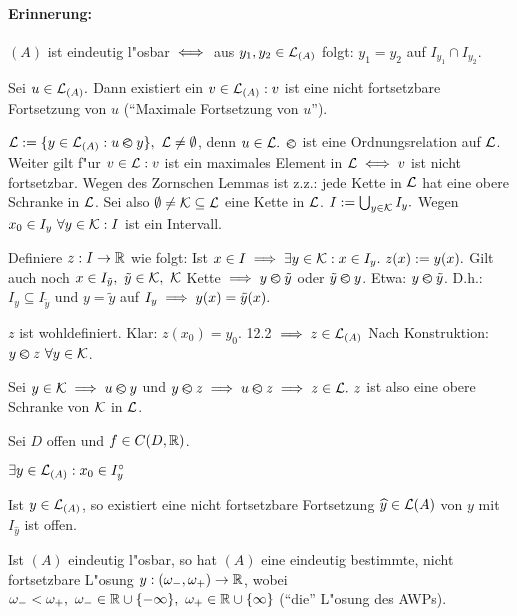 \documentclass[a4paper,twoside,DIV15,BCOR12mm]{scrbook}
\begin{document}
\paragraph{Erinnerung:}
$(A)$ ist eindeutig l"osbar $\iff$ aus $y_1,y_2 \in \mathcal{L}_{(A)}$ folgt: $y_1 = y_2$ auf $I_{y_1} \cap I_{y_2}$.

\begin{satz} %
Sei $u \in \mathcal{L}_{(A)}.$ Dann existiert ein $v \in \mathcal{L}_{(A)}: v$ ist eine nicht fortsetzbare Fortsetzung von $u$ ("`Maximale Fortsetzung von $u$"').
\end{satz}

\begin{beweis}
$\L:=\{y\in\L_{(A)}:u\ole y\},\ \L\ne\emptyset$, denn $u\in\mathcal{L}.$ $\varolessthan$ ist eine Ordnungsrelation auf $\mathcal{L}$. Weiter gilt f"ur $v\in\mathcal{L}: v$ ist ein maximales Element in $\mathcal{L} \iff v$ ist nicht fortsetzbar. Wegen des Zornschen Lemmas ist z.z.: jede Kette in $\mathcal{L}$ hat eine obere Schranke in $\mathcal{L}$. Sei also $\emptyset \ne \mathcal{K} \subseteq \mathcal{L}$ eine Kette in $\mathcal{L}$. $I:=\bigcup_{y\in\mathcal{K}} I_y.$ Wegen $x_0\in I_y\ \forall y\in\mathcal{K}: I$ ist ein Intervall.

Definiere $z:I\to\mathbb{R}$ wie folgt: Ist $x\in I \folgt \exists y\in\K: x\in I_y.\ z(x) := y(x).$ Gilt auch noch $x\in I_{\tilde{y}},\ \tilde{y} \in \mathcal{K},\ \mathcal{K}$ Kette $\implies y \varolessthan \tilde{y}$ oder $\tilde{y} \varolessthan y$. Etwa: $y\varolessthan\tilde{y}$. D.h.: $I_y\subseteq I_{\tilde{y}}$ und $y=\tilde{y}$ auf $I_y \implies y(x)=\tilde{y}(x).$

$z$ ist wohldefiniert. Klar: $z(x_0) = y_0$. 12.2 $\implies z \in \mathcal{L}_{(A)}$ Nach Konstruktion: $y\varolessthan z\ \forall y\in\mathcal{K}$.

Sei $y\in\mathcal{K} \implies u\varolessthan y$ und $y\ole z \folgt u\ole z \folgt z \in \L.\ z$ ist also eine obere Schranke von $\mathcal{K}$ in $\mathcal{L}$.
\end{beweis}

\begin{satz} %
Sei $D$ offen und $f\in C(D,\mathbb{R})$.
\begin{liste}
\item $\exists y\in\mathcal{L}_{(A)}: x_0\in I_y^\circ$
\item Ist $y\in\mathcal{L}_{(A)}$, so existiert eine nicht fortsetzbare Fortsetzung $\widehat{y}\in\mathcal{L}{(A)}$ von $y$ mit $I_{\widehat{y}}$ ist offen.
\item Ist $(A)$ eindeutig l"osbar, so hat $(A)$ eine eindeutig bestimmte, nicht fortsetzbare L"osung $y:(\omega_-,\omega_+)\to\mathbb{R}$, wobei $\omega_-<\omega_+,\ \omega_-\in\MdR\cup\{-\infty\},\ \omega_+\in\MdR\cup\{\infty\}$ ("`die"' L"osung des AWPs).
\end{liste}
\end{satz}
\end{document}
